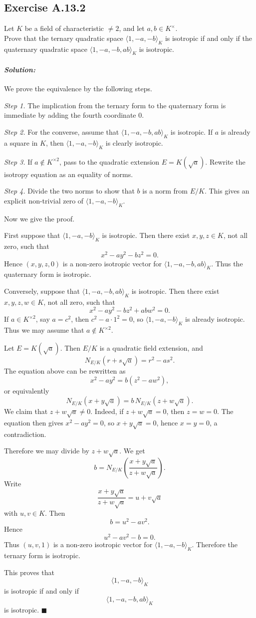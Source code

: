 \documentclass[12pt, a4paper]{article}
\newenvironment{solution}
  {\paragraph{\textit{Solution:}}\par\medskip}
  {\hfill$\blacksquare$\vspace{0.1cm}}
\begin{document}
\subsection*{Exercise A.13.2}
Let $K$ be a field of characteristic $\neq 2$, and let $a, b \in K^\times$. \\
Prove that the ternary quadratic space $\langle 1, -a, -b \rangle_K$ is isotropic if and only if the quaternary quadratic space $\langle 1, -a, -b, ab \rangle_K$ is isotropic.
\begin{solution}
We prove the equivalence by the following steps.

\emph{Step 1.} The implication from the ternary form to the quaternary form is
immediate by adding the fourth coordinate \(0\).

\emph{Step 2.} For the converse, assume that
\(\langle 1,-a,-b,ab\rangle_K\) is isotropic. If \(a\) is already a square in
\(K\), then \(\langle 1,-a,-b\rangle_K\) is clearly isotropic.

\emph{Step 3.} If \(a\notin K^{\times 2}\), pass to the quadratic extension
\(E=K(\sqrt a)\). Rewrite the isotropy equation as an equality of norms.

\emph{Step 4.} Divide the two norms to show that \(b\) is a norm from
\(E/K\). This gives an explicit non-trivial zero of
\(\langle 1,-a,-b\rangle_K\).

Now we give the proof.

First suppose that \(\langle 1,-a,-b\rangle_K\) is isotropic. Then there exist
\(x,y,z\in K\), not all zero, such that
\[
x^2-ay^2-bz^2=0.
\]
Hence \((x,y,z,0)\) is a non-zero isotropic vector for
\(\langle 1,-a,-b,ab\rangle_K\). Thus the quaternary form is isotropic.

Conversely, suppose that \(\langle 1,-a,-b,ab\rangle_K\) is isotropic. Then
there exist \(x,y,z,w\in K\), not all zero, such that
\[
x^2-ay^2-bz^2+ab w^2=0.
\]
If \(a\in K^{\times 2}\), say \(a=c^2\), then
\(c^2-a\cdot 1^2=0\), so \(\langle 1,-a,-b\rangle_K\) is already isotropic.
Thus we may assume that \(a\notin K^{\times 2}\).

Let \(E=K(\sqrt a)\). Then \(E/K\) is a quadratic field extension, and
\[
N_{E/K}(r+s\sqrt a)=r^2-a s^2.
\]
The equation above can be rewritten as
\[
x^2-ay^2=b(z^2-aw^2),
\]
or equivalently
\[
N_{E/K}(x+y\sqrt a)=b\,N_{E/K}(z+w\sqrt a).
\]
We claim that \(z+w\sqrt a\neq 0\). Indeed, if \(z+w\sqrt a=0\), then
\(z=w=0\). The equation then gives \(x^2-ay^2=0\), so
\(x+y\sqrt a=0\), hence \(x=y=0\), a contradiction.

Therefore we may divide by \(z+w\sqrt a\). We get
\[
b=N_{E/K}\left(\frac{x+y\sqrt a}{z+w\sqrt a}\right).
\]
Write
\[
\frac{x+y\sqrt a}{z+w\sqrt a}=u+v\sqrt a
\]
with \(u,v\in K\). Then
\[
b=u^2-av^2.
\]
Hence
\[
u^2-av^2-b=0.
\]
Thus \((u,v,1)\) is a non-zero isotropic vector for
\(\langle 1,-a,-b\rangle_K\). Therefore the ternary form is isotropic.

This proves that
\[
\langle 1,-a,-b\rangle_K
\]
is isotropic if and only if
\[
\langle 1,-a,-b,ab\rangle_K
\]
is isotropic.
\end{solution}
\end{document}
